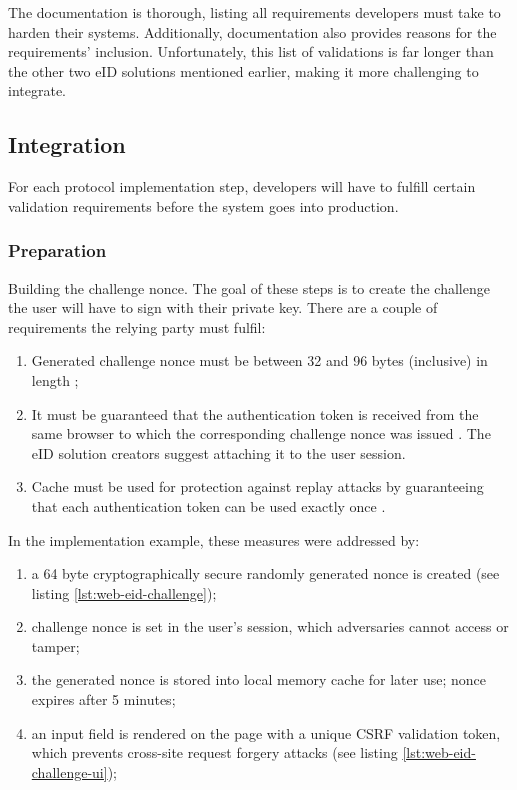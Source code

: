 The documentation is thorough, listing all requirements developers must take to harden their systems. Additionally, documentation also provides reasons for the requirements' inclusion. Unfortunately, this list of validations is far longer than the other two eID solutions mentioned earlier, making it more challenging to integrate.

\subsection{Integration}

For each protocol implementation step, developers will have to fulfill certain validation requirements before the system goes into production.

\subsubsection{Preparation}

Building the challenge nonce. The goal of these steps is to create the challenge the user will have to sign with their private key. There are a couple of requirements the relying party must fulfil:
\begin{enumerate}
  \item Generated challenge nonce must be between 32 and 96 bytes (inclusive) in length \cite{ria-webeid-source-web-eid-app-authenticate};
  \item It must be guaranteed that the authentication token is received from the same browser to which the corresponding challenge nonce was issued \cite{ria-webeid-source-web-eid-authtoken-validation-java-readme}. The eID solution creators suggest attaching it to the user session.
  \item Cache must be used for protection against replay attacks by guaranteeing that each authentication token can be used exactly once \cite{ria-webeid-source-web-eid-authtoken-validation-java-readme}.
\end{enumerate}

In the implementation example, these measures were addressed by:
\begin{enumerate}
  \item a 64 byte cryptographically secure randomly generated nonce is created (see listing \ref{lst:web-eid-challenge});
  \item challenge nonce is set in the user's session, which adversaries cannot access or tamper;
  \item the generated nonce is stored into local memory cache for later use; nonce expires after 5 minutes;
  \item an input field is rendered on the page with a unique CSRF validation token, which prevents cross-site request forgery attacks (see listing \ref{lst:web-eid-challenge-ui});
\end{enumerate}

